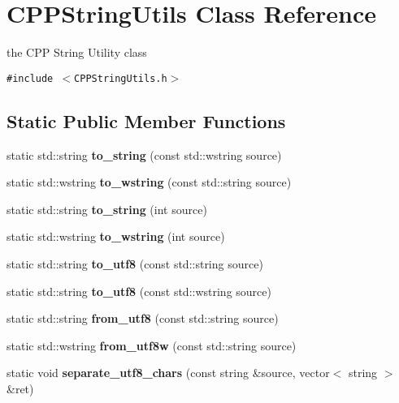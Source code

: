 \section{CPPStringUtils Class Reference}
\label{classCPPStringUtils}
the CPP String Utility class  


{\tt \#include $<$CPPStringUtils.h$>$}

\subsection*{Static Public Member Functions}
\begin{CompactItemize}
\item 
static std::string \textbf{to\_\-string} (const std::wstring source)\label{classCPPStringUtils_f9c18bef8a105cf0082b3f6cc4c84a51}

\item 
static std::wstring \textbf{to\_\-wstring} (const std::string source)\label{classCPPStringUtils_92b4384044e71a93cd1f4a521b68f9e8}

\item 
static std::string \textbf{to\_\-string} (int source)\label{classCPPStringUtils_65fa7689b204cd5a60e10619168036a7}

\item 
static std::wstring \textbf{to\_\-wstring} (int source)\label{classCPPStringUtils_940c65dda5f8798ae6e7ce5927f16558}

\item 
static std::string \textbf{to\_\-utf8} (const std::string source)\label{classCPPStringUtils_fa13ebc9f5a56289d7e985cb8f7ccc48}

\item 
static std::string \textbf{to\_\-utf8} (const std::wstring source)\label{classCPPStringUtils_4d61f2e6897ebfb46b409f66cfaf2cc9}

\item 
static std::string \textbf{from\_\-utf8} (const std::string source)\label{classCPPStringUtils_11efd28c277a70fa279ceb14e930af96}

\item 
static std::wstring \textbf{from\_\-utf8w} (const std::string source)\label{classCPPStringUtils_e03a71420a0600ee0e58196456fe681e}

\item 
static void \textbf{separate\_\-utf8\_\-chars} (const string \&source, vector$<$ string $>$ \&ret)\label{classCPPStringUtils_0828fbcabd983d1bd66fb9ebd7a1dd50}


\end{CompactItemize}
